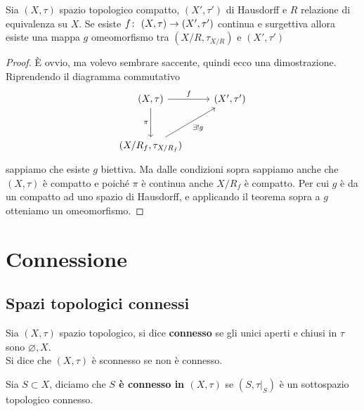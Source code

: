 \begin{corollary}
	\label{thr:freeomeombyquo}
	Sia $(X, \tau)$ spazio topologico compatto, $(X', \tau')$ di Hausdorff e $R$ relazione di equivalenza su $X$. Se esiste $f \colon\ (X, \tau) \rightarrow (X', \tau')$ continua e surgettiva allora esiste una mappa $g$ omeomorfismo tra $(X/R,\tau_{X/R})$ e $(X', \tau')$
\end{corollary}
\begin{proof}
	È ovvio, ma volevo sembrare saccente, quindi ecco una dimostrazione.
	Riprendendo il diagramma commutativo 
	\begin{equation*}
		\begin{tikzcd}[row sep = 3em]
			(X, \tau) \arrow[swap]{d}{\pi} \arrow{r}{f} & (X', \tau') \\
			(X/R_f, \tau_{X/R_f}) \arrow[swap]{ru}{\exists! g} &
		\end{tikzcd}	
	\end{equation*}
	sappiamo che esiste $g$ biettiva. Ma dalle condizioni sopra sappiamo anche che $(X,\tau)$ è compatto e poiché $\pi$ è continua anche $X/R_f$ è compatto. Per cui $g$ è da un compatto ad uno spazio di Hausdorff, e applicando il teorema sopra a $g$ otteniamo un omeomorfismo. 
\end{proof}



\section{Connessione}
\subsection{\textcolor{TopGener}{\textbf{Spazi topologici connessi}}}



\begin{definition}
	Sia $(X, \tau)$ spazio topologico, si dice \textbf{connesso} se gli unici aperti e chiusi in $\tau$ sono $\varnothing, X$. \\ Si dice che $(X, \tau)$ è sconnesso se non è connesso. 
\end{definition} 

\begin{definition}
	Sia $S \subset X$, diciamo che \textbf{$S$ è connesso in $(X, \tau)$} se $(S, \tau|_S)$ è un sottospazio topologico connesso. 
\end{definition} 

